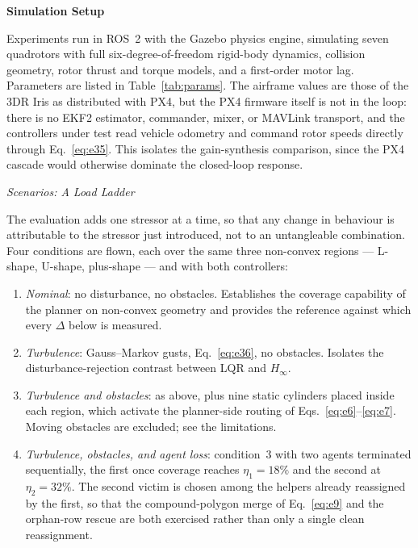 \documentclass[10pt,letterpaper]{article}
\newcommand{\headingtwo}[1]{%
    \par\vspace{7pt}%
    {\centering\fontsize{12}{14}\selectfont\bfseries #1\par}%
    \vspace{3pt}\noindent\ignorespaces}
\newcommand{\headingthree}[1]{%
    \par\vspace{6pt}%
    {\centering\fontsize{10}{12}\selectfont\itshape #1\par}%
    \vspace{2pt}\noindent\ignorespaces}
\begin{document}
\headingtwo{Simulation Setup}

Experiments run in ROS~2 with the Gazebo physics engine, simulating seven quadrotors with
full six-degree-of-freedom rigid-body dynamics, collision geometry, rotor thrust and torque
models, and a first-order motor lag. Parameters are listed in Table~\ref{tab:params}. The
airframe values are those of the 3DR Iris as distributed with PX4, but the PX4 firmware
itself is not in the loop: there is no EKF2 estimator, commander, mixer, or MAVLink
transport, and the controllers under test read vehicle odometry and command rotor speeds
directly through Eq.~\eqref{eq:e35}. This isolates the gain-synthesis comparison, since the PX4
cascade would otherwise dominate the closed-loop response.

\headingthree{Scenarios: A Load Ladder}

The evaluation adds one stressor at a time, so that any change in behaviour is
attributable to the stressor just introduced, not to an untangleable combination.
Four conditions are flown, each over the same three non-convex regions --- L-shape,
U-shape, plus-shape --- and with both controllers:

\begin{enumerate}[nosep,leftmargin=*,topsep=4pt]
    \item \emph{Nominal}: no disturbance, no obstacles. Establishes the coverage
          capability of the planner on non-convex geometry and provides the reference
          against which every $\Delta$ below is measured.
    \item \emph{Turbulence}: Gauss--Markov gusts, Eq.~\eqref{eq:e36}, no obstacles. Isolates
          the disturbance-rejection contrast between LQR and $H_\infty$.
    \item \emph{Turbulence and obstacles}: as above, plus nine static cylinders placed
          inside each region, which activate the planner-side routing of
          Eqs.~\eqref{eq:e6}--\eqref{eq:e7}. Moving obstacles are excluded; see the
          limitations.
    \item \emph{Turbulence, obstacles, and agent loss}: condition~3 with two agents
          terminated sequentially, the first once coverage reaches $\eta_1=18\%$ and the
          second at $\eta_2=32\%$. The second victim is chosen among the helpers already
          reassigned by the first, so that the compound-polygon merge of Eq.~\eqref{eq:e9}
          and the orphan-row rescue are both exercised rather than only a single clean
          reassignment.
\end{enumerate}
\end{document}
